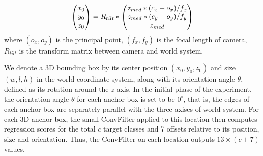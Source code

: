 \documentclass[10pt,twocolumn,letterpaper]{article}
\begin{document}
	\begin{equation}
	\vspace{-1mm}
	\begin{pmatrix} x_{0} \\ y_{0} \\ z_{0} \end{pmatrix} = R_{tilt} * \begin{pmatrix} z_{med} * (c_{x} - o_{x}) / f_{x} \\ z_{med} * (c_{y} - o_{y}) / f_{y} \\ z_{med}\end{pmatrix}
	\end{equation}
	where $(o_{x}, o_{y})$ is the principal point, $(f_{x},f_{y})$ is the focal length of camera, $R_{tilt}$ is the transform matrix between camera and world system. \par
	
	We denote a 3D bounding box by its center position $(x_{0}, y_{0}, z_{0})$ and  size $(w, l, h)$ in the world coordinate system, along with its orientation angle $\theta$, defined as its rotation around the $z$ axis. In the initial phase of the experiment, the orientation angle $\theta$ for each anchor box is set to be $0^{\circ}$, that is, the edges of each anchor box are separately parallel with the three axises of world system. For each 3D anchor box, the small ConvFilter applied to this location then computes regression scores for the total $c$ target classes and 7 offsets relative to its position, size and orientation. Thus, the ConvFilter on each location outputs $13\times(c+7)$ values.\par
	
\end{document}
